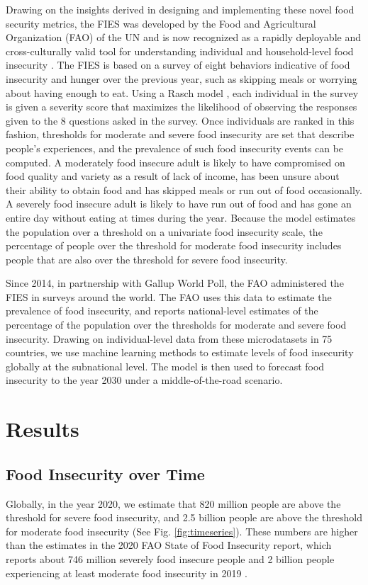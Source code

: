 \documentclass{article}
\begin{document}
Drawing on the insights derived in designing and implementing these novel food security metrics, the FIES was developed by the Food and Agricultural Organization (FAO) of the UN \cite{Ballard2013} and is now recognized as a rapidly deployable and cross-culturally valid tool for understanding individual and household-level food insecurity \citep{wambogo2018validity, smith2017world}.  The FIES is based on a survey of eight behaviors indicative of food insecurity and hunger over the previous year, such as skipping meals or worrying about having enough to eat.  Using a Rasch model \citep{Cafiero2018}, each individual in the survey is given a severity score that maximizes the likelihood of observing the responses given to the 8 questions asked in the survey.  Once individuals are ranked in this fashion, thresholds for moderate and severe food insecurity are set that describe people's experiences, and the prevalence of such food insecurity events can be computed. A moderately food insecure adult is likely to have compromised on food quality and variety as a result of lack of income, has been unsure about their ability to obtain food and has skipped meals or run out of food occasionally. A severely food insecure adult is likely to have run out of food and has gone an entire day without eating at times during the year.  Because the model estimates the population over a threshold on a univariate food insecurity scale, the percentage of people over the threshold for moderate food insecurity includes people that are also over the threshold for severe food insecurity.

Since 2014, in partnership with Gallup World Poll, the FAO administered the FIES in surveys around the world. The FAO uses this data to estimate the prevalence of food insecurity, and reports national-level estimates of the percentage of the population over the thresholds for moderate and severe food insecurity.  Drawing on individual-level data from these microdatasets in 75 countries, we use machine learning methods to estimate levels of food insecurity globally at the subnational level.  The model is then used to forecast food insecurity to the year 2030 under a middle-of-the-road scenario.

\section{Results}
\subsection{Food Insecurity over Time}
Globally, in the year 2020, we estimate that 820 million people are above the threshold for severe food insecurity, and 2.5 billion people are above the threshold for moderate food insecurity (See Fig. \ref{fig:timeseries}). These numbers are higher than the estimates in the 2020 FAO State of Food Insecurity report, which reports about 746 million severely food insecure people and 2 billion people experiencing at least moderate food insecurity in 2019 \citep{sofi2020}. 
\end{document}
